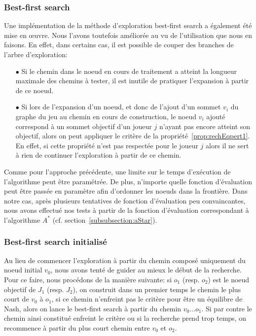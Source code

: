 \subsubsection*{Best-first search}

Une implémentation de la méthode d'exploration best-first search a également été mise en \oe uvre. Nous l'avons toutefois améliorée au vu de l'utilisation que nous en faisons. En effet, dans certains cas, il est possible de couper des branches de l'arbre d'exploration:

\begin{itemize}
	\item[$\bullet$] Si le chemin dans le noeud en cours de traitement a atteint la longueur maximale des chemins à tester, il est inutile de pratiquer l'expansion à partir de ce noeud.
	\item[$\bullet$]Si lors de l'expansion d'un noeud, et donc de l'ajout d'un sommet $v_i$ du graphe du jeu au chemin en cours de construction, le noeud  $v_i$ ajouté correspond à un sommet objectif d'un joueur $j$ n'ayant pas encore atteint son objectif, alors on peut appliquer le critère de la propriété~\ref{prop:rechEqpert1}. En effet, si cette propriété n'est pas respectée pour le joueur $j$ alors il ne sert à rien de continuer l'exploration à partir de ce chemin.
\end{itemize}

Comme pour l'approche précédente, une limite sur le temps d'exécution de l'algorithme peut être paramétrée. De plus, n'importe quelle fonction d'évaluation peut être passée en paramètre afin d'ordonner les noeuds dans la frontière. Dans notre cas, après plusieurs tentatives de fonction d'évaluation peu convaincantes, nous avons effectué nos tests à partir de la fonction d'évaluation correspondant à l'algorithme $A^*$ (cf. section~\ref{subsubsection:aStar}).

\subsubsection*{Best-first search initialisé}

Au lieu de commencer l'exploration à partir du chemin composé uniquement du noeud initial $v_0$, nous avons tenté de guider au mieux le début de la recherche. Pour ce faire, nous procédons de la manière suivante: si $o_1$ (resp. $o_2$) est le noeud objectif de $J_1$ (resp. $J_2$), on construit dans un premier temps le chemin le plus court de $v_0$ à $o_1$, si ce chemin n'enfreint pas le critère pour être un équilibre de Nash, alors on lance le best-first search à partir du chemin $v_0 ... o_1$. Si par contre le chemin ainsi constitué enfreint le critère ou si la recherche prend trop temps, on recommence à partir du plus court chemin entre $v_0$ et $o_2$.




	